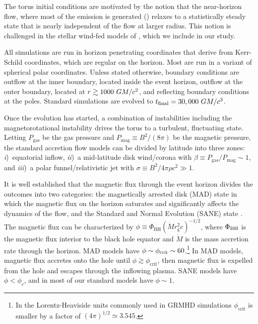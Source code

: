 The torus initial conditions are motivated by the notion that the near-horizon flow, where most of the emission is generated () relaxes to a statistically steady state that is nearly independent of the flow at larger radius.  This notion is challenged in the stellar wind-fed models of \cite{2020ApJ...896L...6R}, which we include in our study.

All simulations are run in horizon penetrating coordinates that derive from Kerr-Schild coordinates, which are regular on the horizon.
Most are run in a variant of spherical polar coordinates.
Unless stated otherwise, boundary conditions are outflow at the inner boundary, located inside the event horizon, outflow at the outer boundary, located at $r \gtrsim 1000~GM/c^2$, and reflecting boundary conditions at the poles.
Standard simulations are evolved to $t_\mathrm{final} = 30,000~GM/c^3$.

Once the evolution has started, a combination of instabilities including the magnetorotational instability \citep[MRI][]{1992ApJ...400..610B} drives the torus to a turbulent, fluctuating state.
Letting $P_\mathrm{gas}$ be the gas pressure and $P_\mathrm{mag} \equiv B^2 / (8\pi)$ be the magnetic pressure, the standard accretion flow models can be divided by latitude into three zones:
\emph{i})~equatorial inflow,
\emph{ii})~a mid-latitude disk wind/corona with  $\beta  \equiv P_\mathrm{gas} / P_\mathrm{mag} \sim 1$, and
\emph{iii})~a polar funnel/relativistic jet with $\sigma \equiv B^2/4\pi \rho c^2 \gg 1$.

It is well established  that the magnetic flux through the event horizon divides the outcomes into two categories: the magnetically arrested disk (MAD) state \citep[e.g.,][]{1974Ap&SS..28...45B, 2003ApJ...592.1042I, 2003PASJ...55L..69N} in which the magnetic flux on the horizon saturates and significantly affects the dynamics of the flow, and the Standard and Normal Evolution (SANE) state \citep[e.g.,][]{2003ApJ...589..444G, 2003ApJ...599.1238D, 2012MNRAS.426.3241N}.
The magnetic flux can be characterized by $\phi \equiv \Phi_{\mathrm{BH}} (\dot{M} r_\mathrm{g}^2 c)^{-1/2}$, where $\Phi_{\rm BH}$ is the magnetic flux interior to the black hole equator and $\dot{M}$ is the mass accretion rate through the horizon.
MAD models have $\phi \sim \phi_{\rm crit} \sim 60$.\footnote{In the Lorentz-Heaviside units commonly used in GRMHD simulations $\phi_\mathrm{crit}$ is smaller by a factor of $(4\pi)^{1/2} \simeq 3.545$.}
In MAD models, magnetic flux accretes onto the hole until $\phi \gtrsim \phi_\mathrm{crit}$, then magnetic flux is expelled from the hole and escapes through the inflowing plasma.  SANE models have $\phi < \phi_c$, and in most of our standard models have $\phi \sim 1$.

